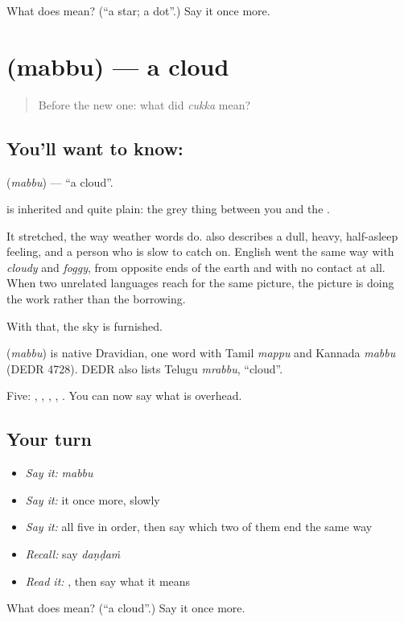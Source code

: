 \begin{tcolorbox}[breakable,colback=teal!4,colframe=teal!35!black,title={Before you move on}]
What does  mean? (\textquotedblleft{}a star; a dot\textquotedblright{}.) Say it once more.
\end{tcolorbox}
\section[\texorpdfstring{\te{మబ్బు} (mabbu)}{మబ్బు (mabbu)}]{ (mabbu) — a cloud}

\label{lesson:TE-C53-cloud}



\begin{quote}
Before the new one: what did \emph{cukka} mean?
\end{quote}

\subsection*{You'll want to know: }
\textbf{} (\emph{mabbu}) — \textquotedblleft{}a cloud\textquotedblright{}.

 is inherited and quite plain: the grey thing between you and the .

It stretched, the way weather words do.  also describes a dull, heavy, half-asleep feeling, and a person who is slow to catch on. English went the same way with \emph{cloudy} and \emph{foggy}, from opposite ends of the earth and with no contact at all. When two unrelated languages reach for the same picture, the picture is doing the work rather than the borrowing.

With that, the sky is furnished.

\begin{cousinweb}
\textbf{} (\emph{mabbu}) is native Dravidian, one word with Tamil \emph{mappu} and Kannada \emph{mabbu} (DEDR 4728). DEDR also lists Telugu \emph{mrabbu}, \textquotedblleft{}cloud\textquotedblright{}.
\end{cousinweb}

\begin{grammarlens}[title={What you've built}]
Five: , , , , . You can now say what is overhead.
\end{grammarlens}

\subsection*{Your turn}
\begin{itemize}
\raggedright
  \item \emph{Say it:} \emph{mabbu}
  \item \emph{Say it:} it once more, slowly
  \item \emph{Say it:} all five in order, then say which two of them end the same way
  \item \emph{Recall:} say \emph{daṇḍaṁ}
  \item \emph{Read it:} \textbf{}, then say what it means
\end{itemize}

\begin{tcolorbox}[breakable,colback=teal!4,colframe=teal!35!black,title={Before you move on}]
What does  mean? (\textquotedblleft{}a cloud\textquotedblright{}.) Say it once more.
\end{tcolorbox}
